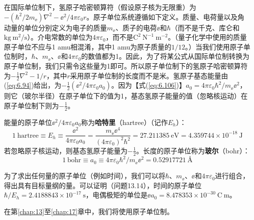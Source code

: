     在国际单位制下，氢原子哈密顿算符（假设原子核为无限重）为$-\left(\hbar^2/2m_{\ee }\right)\nabla^2 - \ee ^2/4\pi\varepsilon_0 r$。原子单位系统遵循如下定义。质量、电荷量以及角动量的单位分别定义为电子的质量$m_{\ee }$、质子的电荷$\ee $和$\hbar$（而不是千克、库仑和$\mathrm{kg}\:\mathrm{m}^2/\mathrm{s}$）。介电常数的单位为$4\pi\varepsilon_0$，而不是$\mathrm{C}^2\:\mathrm{N}^{-1}\:\mathrm{m}^{-2}$。（量子化学中使用的质量原子单位不应与1 amu相混淆，其中1 amu为原子质量的$1/12$。）当我们使用原子单位制时，$\hbar$、$m_{\ee }$、$\ee $和$4\pi\varepsilon_0$的数值都为1。因此，为了将某公式从国际单位制转换为原子单位制，我们只需令这些量为1即可。所以原子单位制下的氢原子哈密顿算符为$-\frac{1}{2}\nabla^2 - 1/r$，其中$r$采用原子单位制的长度而不是米。氢原子基态能量由(\ref{eq:6.94})给出，为$-\frac{1}{2}\left(\ee ^2/4\pi\varepsilon_0a_0\right)$。因为【式(\ref{eq:6.106})】$a_0 = 4\pi\varepsilon_0\hbar^2/m_{\ee }\ee ^2$，则它（玻尔半径）在原子单位下的值为1，基态氢原子能量的值（忽略核运动）在原子单位制下则为$-\frac{1}{2}$。

    能量的原子单位$\ee ^2/4\pi\varepsilon_0a_0$称为\textbf{哈特里}（hartree）（记作$E_h$）：
    \begin{equation}
        1\:\text{hartree} \equiv E_h \equiv \frac{\ee ^2}{4\pi\varepsilon_0a_0} = \frac{m_{\ee }\ee ^4}{\left(4\pi\varepsilon_0\right)^2\hbar^2} = 27.211385 \:\mathrm{eV} = 4.359744 \times 10^{-18} \:\mathrm{J}
        \label{eq:13.29}
    \end{equation}
    若忽略原子核运动，则基态氢原子能量为$-\frac{1}{2}$。长度的原子单位称为\textbf{玻尔}（bohr）：
    \begin{equation}
        1\:\text{bohr} \equiv a_0 \equiv {4\pi\varepsilon_0\hbar^2}/{m_{\ee }\ee ^2} = 0.52917721 \:\mathrm{Å}
        \label{eq:13.30}
    \end{equation}

    为了求出任何量的原子单位（例如时间），我们可以将$\hbar$、$m_{\ee }$、$\ee $和$4\pi\varepsilon_0$进行组合，得出具有目标量纲的量。可以证明（问题13.14），时间的原子单位$\hbar/E_h = 2.4188843 \times 10^{-17} \:\mathrm{s}$，电偶极矩的单位是$\ee a_0 = 8.478353 \times 10^{-30} \:\mathrm{C}\:\mathrm{m}$。

    在第\ref{chap:13}至\ref{chap:17}章中，我们将使用原子单位制。

